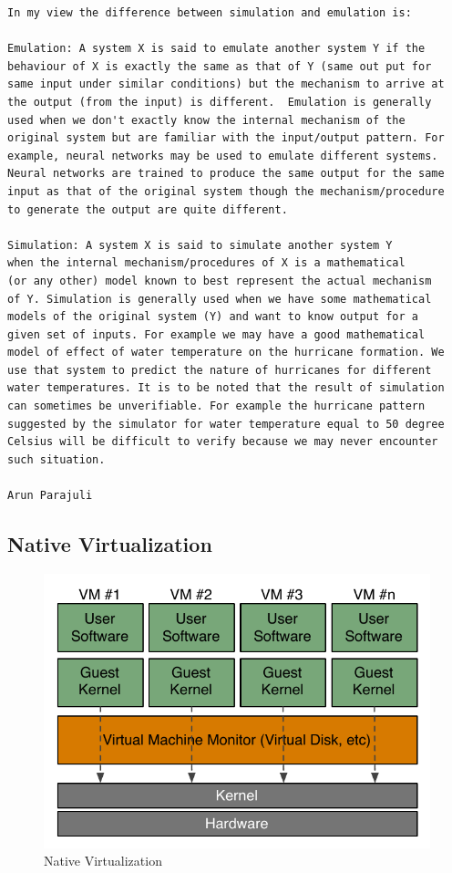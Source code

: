 \begin{verbatim}
In my view the difference between simulation and emulation is:

Emulation: A system X is said to emulate another system Y if the
behaviour of X is exactly the same as that of Y (same out put for
same input under similar conditions) but the mechanism to arrive at
the output (from the input) is different.  Emulation is generally
used when we don't exactly know the internal mechanism of the
original system but are familiar with the input/output pattern. For
example, neural networks may be used to emulate different systems.
Neural networks are trained to produce the same output for the same
input as that of the original system though the mechanism/procedure
to generate the output are quite different.

Simulation: A system X is said to simulate another system Y
when the internal mechanism/procedures of X is a mathematical
(or any other) model known to best represent the actual mechanism
of Y. Simulation is generally used when we have some mathematical
models of the original system (Y) and want to know output for a
given set of inputs. For example we may have a good mathematical
model of effect of water temperature on the hurricane formation. We
use that system to predict the nature of hurricanes for different
water temperatures. It is to be noted that the result of simulation
can sometimes be unverifiable. For example the hurricane pattern
suggested by the simulator for water temperature equal to 50 degree
Celsius will be difficult to verify because we may never encounter
such situation.

Arun Parajuli
\end{verbatim}


\subsection{Native Virtualization}

\begin{figure}[htb]
	\center
	\includegraphics[scale=0.75]{intro/native-virtualization}
	\caption{Native Virtualization}
\end{figure}

